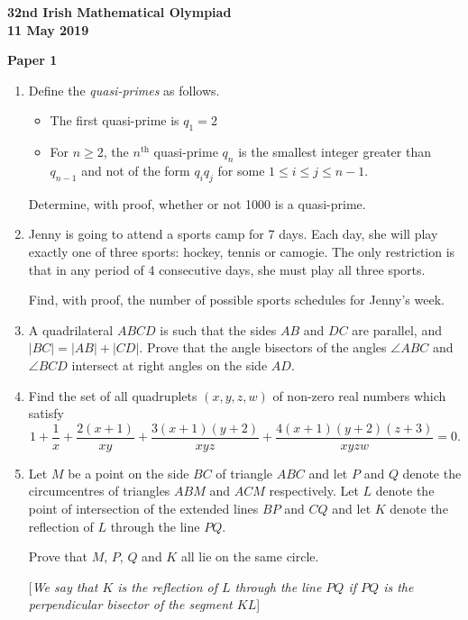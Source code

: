 \documentclass[12pt]{article}
\begin{document}
\begin{center}
{\large\bfseries 32nd Irish Mathematical Olympiad\\11 May 2019}
\end{center}
\bigskip\noindent\textbf{Paper 1}\bigskip
\begin{enumerate}
\item Define the \textit{quasi-primes} as follows.
\begin{itemize}
\item The first quasi-prime is $q_1 = 2$
\item For $n \ge 2$, the $n^{\text{th}}$ quasi-prime $q_n$ is the smallest integer greater than $q_{n-1}$ and not of the form $q_i q_j$ for some $1 \le i \le j \le n-1$.
\end{itemize}
Determine, with proof, whether or not 1000 is a quasi-prime.

\item Jenny is going to attend a sports camp for 7 days. Each day, she will play exactly one of three sports: hockey, tennis or camogie. The only restriction is that in any period of 4 consecutive days, she must play all three sports.

Find, with proof, the number of possible sports schedules for Jenny's week.

\item A quadrilateral $ABCD$ is such that the sides $AB$ and $DC$ are parallel, and $|BC| = |AB| + |CD|$. Prove that the angle bisectors of the angles $\angle ABC$ and $\angle BCD$ intersect at right angles on the side $AD$.

\item Find the set of all quadruplets $(x, y, z, w)$ of non-zero real numbers which satisfy
\[
1 + \frac{1}{x} + \frac{2(x+1)}{xy} + \frac{3(x+1)(y+2)}{xyz} + \frac{4(x+1)(y+2)(z+3)}{xyzw} = 0.
\]

\item Let $M$ be a point on the side $BC$ of triangle $ABC$ and let $P$ and $Q$ denote the circumcentres of triangles $ABM$ and $ACM$ respectively. Let $L$ denote the point of intersection of the extended lines $BP$ and $CQ$ and let $K$ denote the reflection of $L$ through the line $PQ$.

Prove that $M$, $P$, $Q$ and $K$ all lie on the same circle.

[\textit{We say that $K$ is the reflection of $L$ through the line $PQ$ if $PQ$ is the perpendicular bisector of the segment $KL$}]
\end{enumerate}
\end{document}
